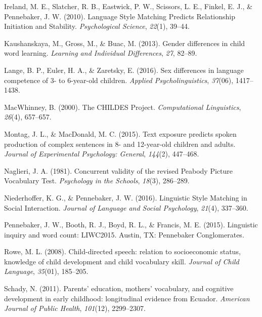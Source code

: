 \documentclass[10pt, letterpaper]{article}
\begin{document}
\leavevmode\hypertarget{ref-Ireland:2010gl}{}%
Ireland, M. E., Slatcher, R. B., Eastwick, P. W., Scissors, L. E.,
Finkel, E. J., \& Pennebaker, J. W. (2010). Language Style Matching
Predicts Relationship Initiation and Stability. \emph{Psychological
Science}, \emph{22}(1), 39--44.

\leavevmode\hypertarget{ref-Kaushanskaya:2013gi}{}%
Kaushanskaya, M., Gross, M., \& Buac, M. (2013). Gender differences in
child word learning. \emph{Learning and Individual Differences},
\emph{27}, 82--89.

\leavevmode\hypertarget{ref-Lange:2016gv}{}%
Lange, B. P., Euler, H. A., \& Zaretsky, E. (2016). Sex differences in
language competence of 3- to 6-year-old children. \emph{Applied
Psycholinguistics}, \emph{37}(06), 1417--1438.

\leavevmode\hypertarget{ref-MacWhinney:2000jx}{}%
MacWhinney, B. (2000). The CHILDES Project. \emph{Computational
Linguistics}, \emph{26}(4), 657--657.

\leavevmode\hypertarget{ref-Montag:2015iy}{}%
Montag, J. L., \& MacDonald, M. C. (2015). Text exposure predicts spoken
production of complex sentences in 8- and 12-year-old children and
adults. \emph{Journal of Experimental Psychology: General},
\emph{144}(2), 447--468.

\leavevmode\hypertarget{ref-Naglieri:1981ju}{}%
Naglieri, J. A. (1981). Concurrent validity of the revised Peabody
Picture Vocabulary Test. \emph{Psychology in the Schools}, \emph{18}(3),
286--289.

\leavevmode\hypertarget{ref-Niederhoffer:2016co}{}%
Niederhoffer, K. G., \& Pennebaker, J. W. (2016). Linguistic Style
Matching in Social Interaction. \emph{Journal of Language and Social
Psychology}, \emph{21}(4), 337--360.

\leavevmode\hypertarget{ref-Pennebaker:kqtgxul0}{}%
Pennebaker, J. W., Booth, R. J., Boyd, R. L., \& Francis, M. E. (2015).
Linguistic inquiry and word count: LIWC2015. Austin, TX: Pennebaker
Conglomerates.

\leavevmode\hypertarget{ref-ROWE:2008go}{}%
Rowe, M. L. (2008). Child-directed speech: relation to socioeconomic
status, knowledge of child development and child vocabulary skill.
\emph{Journal of Child Language}, \emph{35}(01), 185--205.

\leavevmode\hypertarget{ref-Schady:2011bb}{}%
Schady, N. (2011). Parents' education, mothers' vocabulary, and
cognitive development in early childhood: longitudinal evidence from
Ecuador. \emph{American Journal of Public Health}, \emph{101}(12),
2299--2307.
\end{document}
